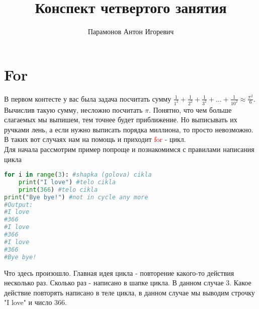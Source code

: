 \documentclass[12pt]{article} %
\begin{document}
\title{Конспект четвертого занятия}
\author{Парамонов Антон Игоревич}
\maketitle
\section{For}
В первом контесте у вас была задача посчитать сумму $\frac{1}{1^2} + \frac{1}{2^2} + \frac{1}{3^2} + \ldots + \frac{1}{10^2} \approx \frac{\pi^2}{6}$. Вычислив такую сумму, несложно посчитать $\pi$. Понятно, что чем больше слагаемых мы выпишем, тем точнее будет приближение. Но выписывать их ручками лень, а если нужно выписать порядка миллиона, то просто невозможно. В таких вот случаях нам на помощь и приходит \textcolor{red}{for} - цикл.\\
Для начала рассмотрим пример попроще и познакомимся с правилами написания цикла
\begin{lstlisting}[language=Python]
for i in range(3): #shapka (golova) cikla
	print("I love") #telo cikla
	print(366) #telo cikla
print("Bye bye!") #not in cycle any more
#Output:
#I love
#366
#I love
#366
#I love
#366
#Bye bye!
\end{lstlisting}
Что здесь произошло. Главная идея цикла - повторение какого-то действия несколько раз. Сколько раз - написано в шапке цикла. В данном случае 3. Какое действие повторять написано в теле цикла, в данном случае мы выводим строчку "I love" и число 366.\\
\end{document}
